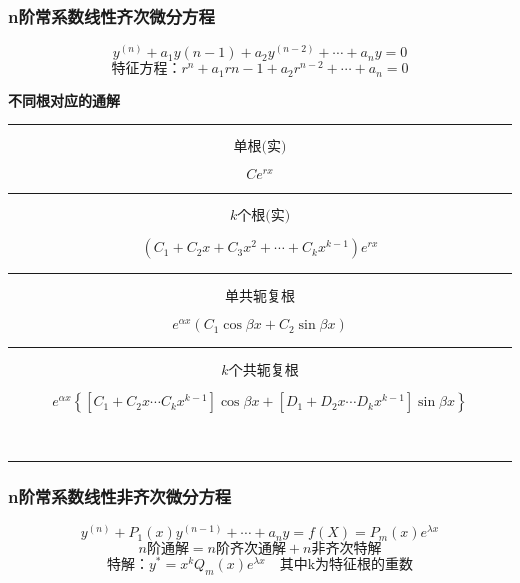 \subsubsection{n阶常系数线性齐次微分方程}
$$y^{(n)}+a_1y{(n-1)}+a_2y^{(n-2)}+\cdots+a_ny=0$$
$$\mbox{特征方程：}r^n+a_1r{n-1}+a_2r^{n-2}+\cdots+a_n=0$$
\centerline{\textbf{不同根对应的通解}}
\noindent\rule[\fill]{\textwidth}{0.4pt}
\begin{minipage}{.2\textwidth}
$$\mbox{单根(实)}$$
\end{minipage}
\hfill
\vline
\begin{minipage}{.8\textwidth}
	$$Ce^{rx}$$
\end{minipage}
\noindent\rule[\fill]{\textwidth}{0.4pt}
\begin{minipage}{.2\textwidth}
	$$\mbox{$k$个根(实)}$$
\end{minipage}
\hfill
\vline
\begin{minipage}{.8\textwidth}
	$$(C_1+C_2x+C_3x^2+\cdots+C_kx^{k-1})e^{rx}$$
\end{minipage}
\noindent\rule[\fill]{\textwidth}{0.4pt}
\begin{minipage}{.2\textwidth}
	$$\mbox{单共轭复根}$$
\end{minipage}
\hfill
\vline
\begin{minipage}{.8\textwidth}
	$$e^{\alpha x}(C_1\cos\beta x+C_2\sin\beta x)$$
\end{minipage}
\noindent\rule[\fill]{\textwidth}{0.4pt}
\begin{minipage}{.2\textwidth}
	$$\mbox{$k$个共轭复根}$$
\end{minipage}
\hfill
\vline
\begin{minipage}{.8\textwidth}
	$$e^{\alpha x}\left\{\left[C_1+C_2x\cdots C_kx^{k-1}\right]\cos\beta x+\left[D_1+D_2x\cdots D_kx^{k-1}\right]\sin\beta x\right\}$$
\end{minipage}\\ 
\noindent\rule[\fill]{\textwidth}{0.4pt}
\subsubsection{n阶常系数线性非齐次微分方程}
$$y^{(n)}+P_1(x)y^{(n-1)}+\cdots+a_ny=f(X)=P_m(x)e^{\lambda x}$$
$$n\mbox{阶通解}=n\mbox{阶齐次通解}+n\mbox{非齐次特解}$$
$$\mbox{特解：}y^*=x^kQ_m(x)e^{\lambda x}\quad\mbox{其中k为特征根的重数}$$
